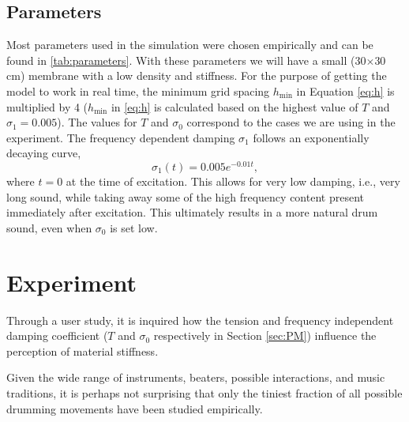 \documentclass{article}
\begin{document}
\subsection{Parameters}
Most parameters used in the simulation were chosen empirically and can be found in \autoref{tab:parameters}. With these parameters we will have a small (30$\times$30 cm) membrane with a low density and stiffness. For the purpose of getting the model to work in real time, the minimum grid spacing $h_\text{min}$ in Equation \eqref{eq:h} is multiplied by 4 ($h_\text{min}$ in \eqref{eq:h} is calculated based on the highest value of $T$ and $\sigma_1 = 0.005$). The values for $T$ and $\sigma_0$ correspond to the cases we are using in the experiment. The frequency dependent damping  $\sigma_1$ follows an exponentially decaying curve, 
\begin{equation}
    \sigma_1(t) = 0.005e^{-0.01 t},
\end{equation}
where $t=0$ at the time of excitation. This allows for very low damping, i.e., very long sound, while taking away some of the high frequency content present immediately after excitation. This ultimately results in a more natural drum sound, even when $\sigma_0$ is set low.

\section{Experiment}\label{sec:exp}

Through a user study, it is inquired how the tension and frequency independent damping coefficient ($T$ and $\sigma_0$ respectively in Section \ref{sec:PM}) influence the perception of material stiffness.

Given the wide range of instruments, beaters, possible interactions, and music traditions, it is perhaps not surprising that only the tiniest fraction of all possible drumming movements have been studied empirically.
\end{document}
